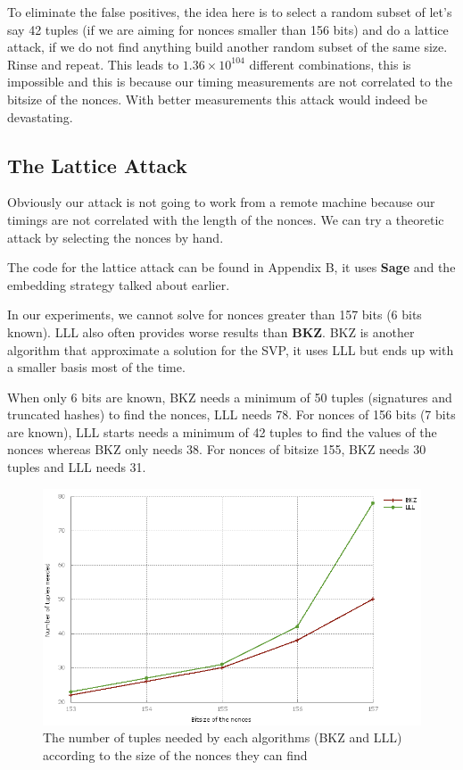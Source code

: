 \documentclass[a4paper,11pt]{article}
\begin{document}
To eliminate the false positives, the idea here is to select a random subset of let's say 42 tuples (if we are aiming for nonces smaller than 156 bits) and do a lattice attack, if we do not find anything build another random subset of the same size. Rinse and repeat. This leads to $1.36 \times 10^{104}$ different combinations, this is impossible and this is because our timing measurements are not correlated to the bitsize of the nonces. With better measurements this attack would indeed be devastating.

\subsection{The Lattice Attack}

Obviously our attack is not going to work from a remote machine because our timings are not correlated with the length of the nonces. We can try a theoretic attack by selecting the nonces by hand.

The code for the lattice attack can be found in Appendix B, it uses \textbf{Sage} and the embedding strategy talked about earlier.

In our experiments, we cannot solve for nonces greater than 157 bits (6 bits known). LLL also often provides worse results than \textbf{BKZ}. BKZ is another algorithm that approximate a solution for the SVP, it uses LLL but ends up with a smaller basis most of the time.

When only 6 bits are known, BKZ needs a minimum of 50 tuples (signatures and truncated hashes) to find the nonces, LLL needs 78. For nonces of 156 bits (7 bits are known), LLL starts needs a minimum of 42 tuples to find the values of the nonces whereas BKZ only needs 38. For nonces of bitsize 155, BKZ needs 30 tuples and LLL needs 31.

\begin{figure}[H]
\includegraphics[width=\textwidth]{nice_web_plot.png}
\caption{The number of tuples needed by each algorithms (BKZ and LLL) according to the size of the nonces they can find}
\end{figure}
\end{document}
